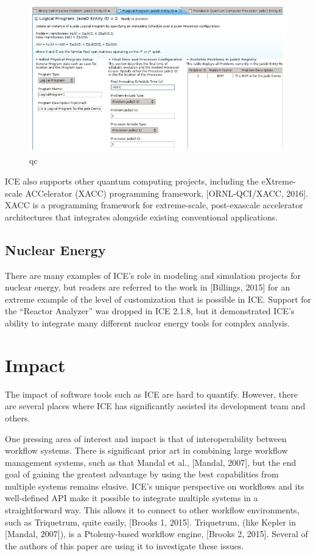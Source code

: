 \begin{figure}[htbp]
\centering
\includegraphics[width=\textwidth]{images/jaded.png}
\caption{qc}
\end{figure}

ICE also supports other quantum computing projects, including the
eXtreme-scale ACCelerator (XACC) programming framework,
{[}ORNL-QCI/XACC, 2016{]}. XACC is a programming framework for
extreme-scale, post-exascale accelerator architectures that integrates
alongside existing conventional applications.

\subsection{Nuclear Energy}\label{nuclear-energy}

There are many examples of ICE's role in modeling and simulation
projects for nuclear energy, but readers are referred to the work in
{[}Billings, 2015{]} for an extreme example of the level of
customization that is possible in ICE. Support for the ``Reactor
Analyzer'' was dropped in ICE 2.1.8, but it demonstrated ICE's ability
to integrate many different nuclear energy tools for complex analysis.

\section{Impact}\label{impact}

The impact of software tools such as ICE are hard to quantify. However,
there are several places where ICE has significantly assisted its
development team and others.

One pressing area of interest and impact is that of interoperability
between workflow systems. There is significant prior art in combining
large workflow management systems, such as that Mandal et al.,
{[}Mandal, 2007{]}, but the end goal of gaining the greatest advantage
by using the best capabilities from multiple systems remains elusive.
ICE's unique perspective on workflows and its well-defined API make it
possible to integrate multiple systems in a straightforward way. This
allows it to connect to other workflow environments, such as Triquetrum,
quite easily, {[}Brooks 1, 2015{]}. Triquetrum, (like Kepler in
{[}Mandal, 2007{]}), is a Ptolemy-based workflow engine, {[}Brooks 2,
2015{]}. Several of the authors of this paper are using it to
investigate these issues.

